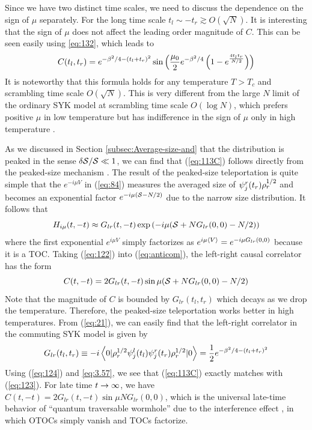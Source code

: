 \documentclass[11pt]{article}
\renewcommand{\>}{\rangle}
\newcommand{\<}{\langle}
\begin{document}
Since we have two distinct time scales, we need to discuss the dependence
on the sign of $\mu$ separately. For the long time scale $t_{l}\sim-t_{r}\gtrsim O(\sqrt{N})$. It is interesting that the sign of $\mu$ does not affect the leading
order magnitude of $C$. This can be seen easily using \eqref{eq:132}, which leads to
\begin{equation}
C(t_{l},t_{r})=e^{-\beta^{2}/4-(t_{l}+t_{r})^{2}}\sin\left(\frac{\mu_{0}}{2}e^{-\beta^{2}/4}\left(1-e^{\frac{4t_{l}t_{r}}{N/2}}\right)\right)\label{eq:113C}
\end{equation}
It is noteworthy that this formula holds for any temperature $T>T_c$ and scrambling time scale $O(\sqrt{N})$.
This is very different from the large $N$ limit of the ordinary SYK model
at scrambling time scale $O(\log N)$, which prefers positive $\mu$
in low temperature but has indifference in the sign of $\mu$ only
in high temperature \cite{Gao:2019nyj}. 

As we discussed in Section \ref{subsec:Average-size-and} that the
distribution is peaked in the sense $\delta\mathcal{S}/\mathcal{S}\ll 1$, we can find that (\ref{eq:113C})
follows directly from the peaked-size mechanism \cite{Schuster:2021uvg}. The result
of the peaked-size teleportation is quite simple that the $e^{-i\mu V}$
in (\ref{eq:84}) measures the averaged size of $\psi_{j}^{r}(t_{r})\rho_{r}^{1/2}$
and becomes an exponential factor $e^{-i\mu(\mathcal{S}-N/2)}$ due to the
narrow size distribution. It follows that
\begin{equation}
H_{i\mu}(t,-t)\approx G_{lr}(t,-t)\exp\left(-i\mu(\mathcal{S}+NG_{lr}(0,0)-N/2)\right)\label{eq:122}
\end{equation}
where the first exponential $e^{i\mu V}$ simply factorizes as $e^{i\mu\left\langle V\right\rangle}=e^{-i\mu G_{lr}(0,0)}$
because it is a TOC. Taking (\ref{eq:122}) into (\ref{eq:anticom}),
the left-right causal correlator has the form
\begin{equation}
C(t,-t)=2G_{lr}(t,-t)\sin\mu(\mathcal{S}+NG_{lr}(0,0)-N/2)\label{eq:123}
\end{equation}
Note that the magnitude of $C$ is bounded by $G_{lr}(t_{l},t_{r})$
which decays as we drop the temperature. Therefore, the peaked-size
teleportation works better in high temperatures. From (\ref{eq:21}),
we can easily find that the left-right correlator in the commuting
SYK model is given by 
\begin{equation}
G_{lr}(t_{l},t_{r})\equiv-i\left\langle 0|\rho_{r}^{1/2}\psi_{j}^{l}(t_{l})\psi_{j}^{r}(t_{r})\rho_{r}^{1/2}|0\right\rangle=\frac{1}{2}e^{-\beta^{2}/4-(t_{l}+t_{r})^{2}}\label{eq:124}
\end{equation}
Using (\ref{eq:124}) and \eqref{eq:3.57}, we see that (\ref{eq:113C}) exactly matches
with (\ref{eq:123}). For late time $t\rightarrow\infty$, we have $C(t,-t)=2G_{lr}(t,-t)\sin\mu NG_{lr}(0,0)$,
which is the universal late-time behavior of ``quantum traversable
wormhole'' due to the interference effect \cite{Gao:2018yzk}, in which OTOCs
simply vanish and TOCs factorize.
\end{document}
